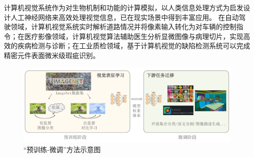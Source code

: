 

计算机视觉系统作为对生物机制和功能的计算模拟，以人类信息处理方式为启发设计人工神经网络来高效处理视觉信息，已在现实场景中得到丰富应用。
在自动驾驶领域，计算机视觉系统实时解析道路情况并将像素输入转化为对车辆的控制指令；在医疗影像领域，计算机视觉算法辅助医生分析显微图像与病理切片，实现高效的疾病检测与诊断；在工业质检领域，基于计算机视觉的缺陷检测系统可以完成精密元件表面微米级瑕疵识别。

\begin{figure}
  \centering
  \includegraphics[width=1.0\linewidth]{figures/论文-图1-预训练-微调-v3.pdf}
  \caption{“预训练-微调”方法示意图}
  \label{fig:1-pt-ft-example}
\end{figure}

